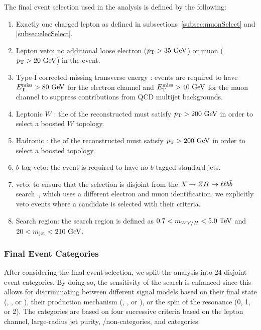 The final event selection used in the analysis is defined by the following:
\begin{enumerate}
  \item Exactly one charged lepton as defined in subsections~\ref{subsec:muonSelect} and \ref{subsec:elecSelect}.
  \item Lepton veto: no additional loose electron ($\pt>35\unit{GeV}$) or muon ($\pt>20\unit{GeV}$) in the event.
  \item Type-I corrected missing transverse energy \EtmissTI: events are required to have $\Etmiss>80\unit{GeV}$ for the electron channel and $\Etmiss>40\unit{GeV}$ for the muon channel to suppress contributions from QCD multijet backgrounds.
  \item Leptonic $W$ \pt: the \pt of the reconstructed \Wlep must satisfy $\pt>200\unit{GeV}$ in order to select a boosted $W$ topology.
  \item Hadronic \VorH \pt: the \pt of the reconstructed \Vhad must satisfy $\pt>200\unit{GeV}$ in order to select a boosted \VorH topology.
  \item $b$-tag veto: the event is required to have no $b$-tagged standard jets.
  \item \ZH veto: to ensure that the selection is disjoint from the $X\to\ZH\to\ell\ell\bbbar$ search~\cite{CMS-PAS-B2G-19-006}, which uses a different electron and muon identification, we explicitly veto events where a \ZH candidate is selected with their criteria.
  \item Search region: the search region is defined as $0.7<\MVV<5.0\unit{TeV}$ and $20<\MJ<210\unit{GeV}$.
\end{enumerate}

\subsubsection{Final Event Categories}
\label{subsec:eventCat}

After considering the final event selection, we split the analysis into 24 disjoint event categories.
By doing so, the sensitivity of the search is enhanced since this allows for discriminating between different signal models based on their final state (\WW, \WZ, or \WH), their production mechanism (\ggF, \DY, or \VBF), or the spin of the resonance (0, 1, or 2).
The categories are based on four successive criteria based on the lepton channel, large-radius jet purity, \VBF/non-\VBF categories, and \Dy categories.

